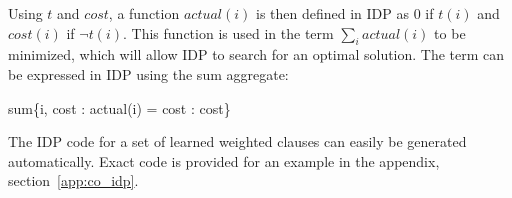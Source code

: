 Using $t$ and $\mathit{cost}$, a function $\mathit{actual}(i)$ is then defined in IDP as 0 if $t(i)$ and $\mathit{cost}(i)$ if $\lnot t(i)$.
This function is used in the term $\sum_i actual(i)$ to be minimized, which will allow IDP to search for an optimal solution.
The term can be expressed in IDP using the sum aggregate:
\begin{shiftedflalign*}
	sum\{i, cost : actual(i) = cost : cost\}
\end{shiftedflalign*}

The IDP code for a set of learned weighted clauses can easily be generated automatically.
Exact code is provided for an example in the appendix, section~\ref{app:co_idp}.